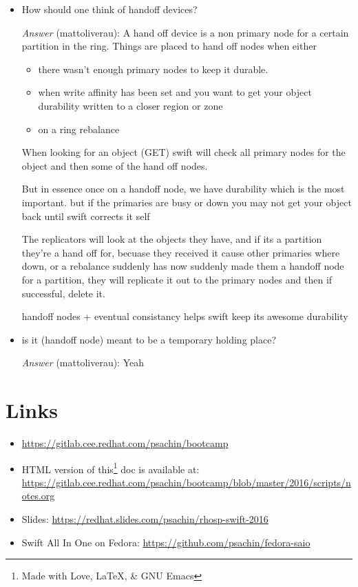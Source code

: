 \documentclass{article}
\begin{document}
\begin{itemize}
\item How should one think of handoff devices?

\emph{Answer} (mattoliverau): A hand off device is a non primary node
for a certain partition in the ring. Things are placed to hand
off nodes when either

\begin{itemize}
\item there wasn't enough primary nodes to keep it durable.
\item when write affinity has been set and you want to get your
object durability written to a closer region or zone
\item on a ring rebalance
\end{itemize}
When looking for an object (GET) swift will check all primary
nodes for the object and then some of the hand off nodes.

But in essence once on a handoff node, we have durability which
is the most important. but if the primaries are busy or down you
may not get your object back until swift corrects it self

The replicators will look at the objects they have, and if its a
partition they're a hand off for, becuase they received it cause
other primaries where down, or a rebalance suddenly has now
suddenly made them a handoff node for a partition, they will
replicate it out to the primary nodes and then if successful,
delete it.

handoff nodes + eventual consistancy helps swift keep its awesome
durability
\end{itemize}


\begin{itemize}
\item is it (handoff node) meant to be a temporary holding place?

\emph{Answer} (mattoliverau): Yeah
\end{itemize}

\section{Links}
\label{sec:org069455c}
\begin{itemize}
\item \url{https://gitlab.cee.redhat.com/psachin/bootcamp}
\item HTML version of this\footnote[1]{Made with Love, \LaTeX, \& GNU Emacs} doc is available at: \newline
\url{https://gitlab.cee.redhat.com/psachin/bootcamp/blob/master/2016/scripts/notes.org}
\item Slides: \url{https://redhat.slides.com/psachin/rhosp-swift-2016}
\item Swift All In One on Fedora: \url{https://github.com/psachin/fedora-saio}
\end{itemize}
\end{document}
